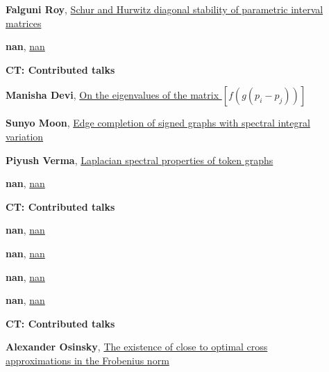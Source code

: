 \documentclass[ILAS2025-program.tex]{subfiles}
\begin{document}
\begin{description}
\begin{description}
        \item[] \hypertarget{up0106}{}\textbf{Falguni Roy}, \hyperlink{down0106}{Schur and Hurwitz diagonal stability of parametric interval matrices}
        \item[] \hypertarget{up0107}{}\textbf{nan}, \hyperlink{down0107}{nan}
        \end{description}
    \begin{description}
    \item[] {\color{mstitle}\textbf{CT: Contributed talks}} 
    \item[] \hypertarget{up0108}{}\textbf{Manisha Devi}, \hyperlink{down0108}{On the eigenvalues of the matrix $[f(g(p_i-p_j))]$}
        \item[] \hypertarget{up0109}{}\textbf{Sunyo Moon}, \hyperlink{down0109}{Edge completion of signed graphs with spectral integral variation}
        \item[] \hypertarget{up0110}{}\textbf{Piyush Verma}, \hyperlink{down0110}{Laplacian spectral properties of token graphs}
        \item[] \hypertarget{up0111}{}\textbf{nan}, \hyperlink{down0111}{nan}
        \end{description}
    \begin{description}
    \item[] {\color{mstitle}\textbf{CT: Contributed talks}} 
    \item[] \hypertarget{up0112}{}\textbf{nan}, \hyperlink{down0112}{nan}
        \item[] \hypertarget{up0113}{}\textbf{nan}, \hyperlink{down0113}{nan}
        \item[] \hypertarget{up0114}{}\textbf{nan}, \hyperlink{down0114}{nan}
        \item[] \hypertarget{up0115}{}\textbf{nan}, \hyperlink{down0115}{nan}
        \end{description}
    \begin{description}
    \item[] {\color{mstitle}\textbf{CT: Contributed talks}} 
    \item[] \hypertarget{up0116}{}\textbf{Alexander Osinsky}, \hyperlink{down0116}{The existence of close to optimal cross approximations in the Frobenius norm}

\end{description}
\end{description}
\end{document}
